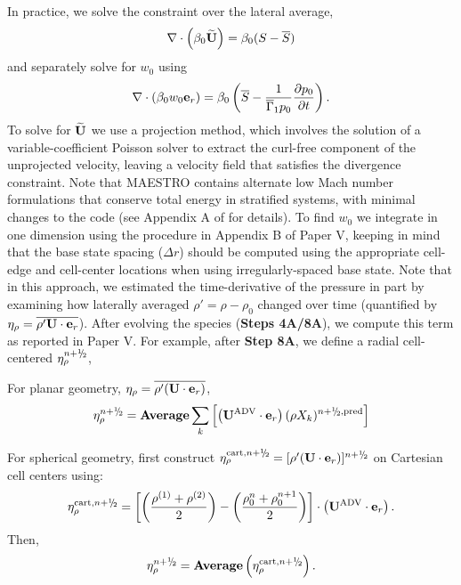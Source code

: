 
In practice, we solve the constraint over the lateral average,
\begin{equation}
\nabla\cdot\left(\beta_0\Ubt\right) = \beta_0(S-\overline{S})
\end{equation}
and separately solve for $w_0$ using 
\begin{equation}
\nabla\cdot(\beta_0w_0\eb_r) = \beta_0\left(\overline{S} - \frac{1}{\gammaonebar p_0}\frac{\partial p_0}{\partial t}\right).
\end{equation}
To solve for $\widetilde{{\bf{U}}}$ we use a projection method, which involves the solution of a variable-coefficient Poisson solver to extract the curl-free component of the unprojected velocity, leaving a velocity field that satisfies the divergence constraint.
Note that MAESTRO contains alternate low Mach number formulations that conserve total energy in stratified systems, with minimal changes to the code (see Appendix A of \cite{subChandra_II} for details).
To find $w_0$ we integrate in one dimension using the procedure in Appendix B of Paper V, keeping in mind that the base state spacing ($\Delta r$) should be computed using the appropriate cell-edge and cell-center locations when using irregularly-spaced base state.
Note that in this approach, we estimated the time-derivative of the pressure in part by examining how laterally averaged $\rho'=\rho-\rho_0$ changed over time (quantified by $\eta_\rho = \overline{\rho'{\bf{U}}\cdot{\bf{e}}_r}$).  After evolving the species ({\bf Steps 4A/8A}), we compute this term as reported in Paper V. For example, after {\bf Step 8A}, we define a radial cell-centered $\etarho^{\nph}$, 

\begin{description}
\item For planar geometry, $\eta_\rho = \overline{\rho'({\bf{U}}\cdot{\bf{e}}_r)}$,
\begin{equation}
 \etarho^{\nph} =  {\rm {\bf Average}} \sum_k \left[ \left(\uadvtwo \cdot \eb_r \right) (\rho X_k)^{\nph,\pred} \right]
\end{equation}
\item For spherical geometry, first construct 
$\etarho^{{\rm cart},\nph} = [\rho'(\Ub\cdot\eb_r)]^{\nph}$ on Cartesian cell centers using:
\begin{equation}
\etarho^{{\rm cart},\nph} = \left[\left(\frac{\rho^{(1)}+\rho^{(2)}}{2}\right)-\left(\frac{\rho_0^n+\rho_0^{n+1}}{2}\right)\right] \cdot \left( \uadvtwo \cdot \eb_r \right).
\end{equation}
Then,
\begin{equation}
\etarho^{\nph} = {\rm {\bf Average}}\left(\etarho^{{\rm cart},\nph}\right).
\end{equation}
\end{description}



